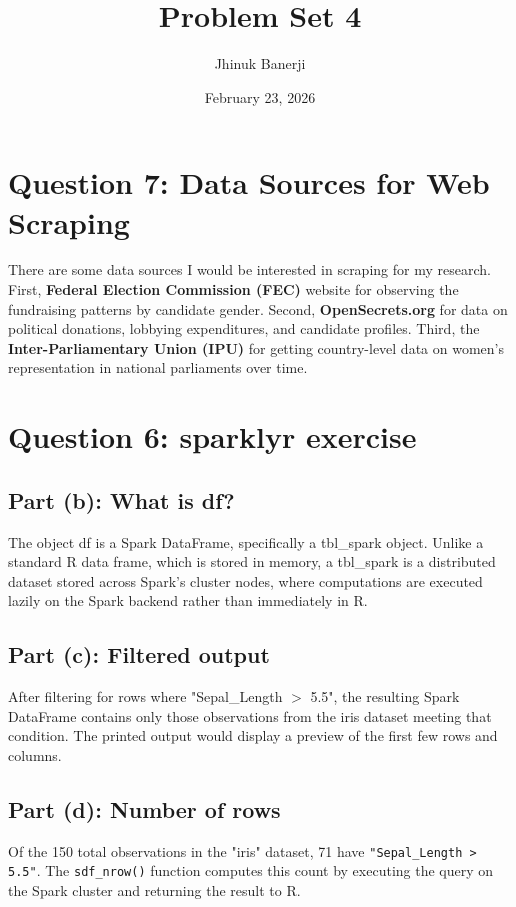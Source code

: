 \documentclass[12pt,letterpaper]{article}
\title{\textbf{Problem Set 4}}
\author{Jhinuk Banerji}
\date{February 23, 2026}
\begin{document}
\maketitle

\section*{Question 7: Data Sources for Web Scraping}

There are some data sources I would be interested in scraping for my research. First, \textbf{Federal Election Commission (FEC)} website for observing the fundraising patterns by candidate gender. Second, \textbf{OpenSecrets.org} for data on political donations, lobbying expenditures, and candidate profiles. Third, the \textbf{Inter-Parliamentary Union (IPU)} for getting country-level data on women's representation in national parliaments over time.

\section*{Question 6: sparklyr exercise}

\subsection*{Part (b): What is df?}

The object df is a Spark DataFrame, specifically a tbl\_spark object. Unlike a standard R data frame, which is stored in memory, a tbl\_spark is a distributed dataset stored across Spark's cluster nodes, where computations are executed lazily on the Spark backend rather than immediately in R.

\subsection*{Part (c): Filtered output}

After filtering for rows where "Sepal\_Length $>$ 5.5", the resulting Spark DataFrame contains only those observations from the iris dataset meeting that condition. The printed output would display a preview of the first few rows and columns.

\subsection*{Part (d): Number of rows}

Of the 150 total observations in the "iris" dataset, 71 have \texttt{"Sepal\_Length > 5.5"}. The \texttt{sdf\_nrow()} function computes this count by executing the query on the Spark cluster and returning the result to R.
\end{document}
